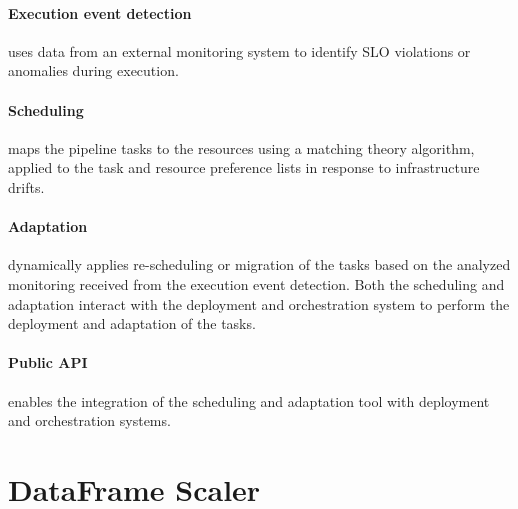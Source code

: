     \paragraph{Execution event detection } uses data from an external monitoring system to identify SLO violations or anomalies during execution.

    \paragraph{Scheduling } maps the pipeline tasks to the resources using a matching theory algorithm, applied to the task and resource preference lists in response to infrastructure drifts.

    \paragraph{Adaptation } dynamically applies re-scheduling or migration of the tasks based on the analyzed monitoring received from the execution event detection. Both the scheduling and adaptation interact with the deployment and orchestration system to perform the deployment and adaptation of the tasks.

    \paragraph{Public API } enables the integration of the \SAA{} scheduling and adaptation tool with deployment and orchestration systems. \cite{kimovskiBigDataPipeline2022}
\section{DataFrame Scaler}
\label{sec:dataframe-scaler-architecture-and-implementation}


